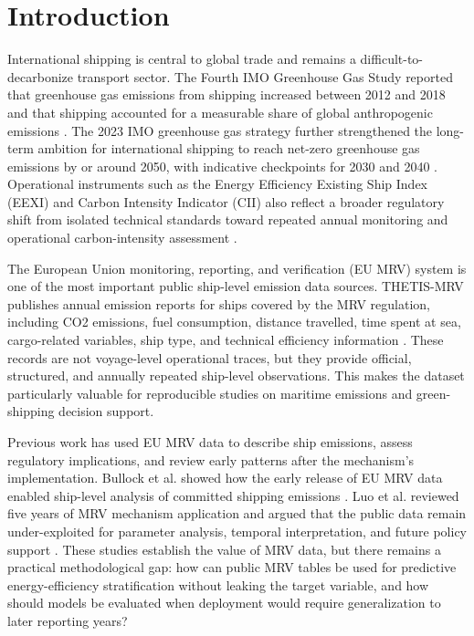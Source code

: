 \documentclass[jmse,article,submit,pdftex,oneauthor]{Definitions/mdpi}
\begin{document}
\section{Introduction}

International shipping is central to global trade and remains a difficult-to-decarbonize transport sector. The Fourth IMO Greenhouse Gas Study reported that greenhouse gas emissions from shipping increased between 2012 and 2018 and that shipping accounted for a measurable share of global anthropogenic emissions \cite{imo_fourth_ghg_study_2020}. The 2023 IMO greenhouse gas strategy further strengthened the long-term ambition for international shipping to reach net-zero greenhouse gas emissions by or around 2050, with indicative checkpoints for 2030 and 2040 \cite{imo_2023_ghg_strategy}. Operational instruments such as the Energy Efficiency Existing Ship Index (EEXI) and Carbon Intensity Indicator (CII) also reflect a broader regulatory shift from isolated technical standards toward repeated annual monitoring and operational carbon-intensity assessment \cite{imo_eexi_cii_faq}.

The European Union monitoring, reporting, and verification (EU MRV) system is one of the most important public ship-level emission data sources. THETIS-MRV publishes annual emission reports for ships covered by the MRV regulation, including CO2 emissions, fuel consumption, distance travelled, time spent at sea, cargo-related variables, ship type, and technical efficiency information \cite{emsa_thetis_mrv,ec_2024_mrv_report,regulation_eu_2015_757}. These records are not voyage-level operational traces, but they provide official, structured, and annually repeated ship-level observations. This makes the dataset particularly valuable for reproducible studies on maritime emissions and green-shipping decision support.

Previous work has used EU MRV data to describe ship emissions, assess regulatory implications, and review early patterns after the mechanism's implementation. Bullock et al. showed how the early release of EU MRV data enabled ship-level analysis of committed shipping emissions \cite{bullock2020shipping_paris}. Luo et al. reviewed five years of MRV mechanism application and argued that the public data remain under-exploited for parameter analysis, temporal interpretation, and future policy support \cite{luo2024mrv_review}. These studies establish the value of MRV data, but there remains a practical methodological gap: how can public MRV tables be used for predictive energy-efficiency stratification without leaking the target variable, and how should models be evaluated when deployment would require generalization to later reporting years?
\end{document}
